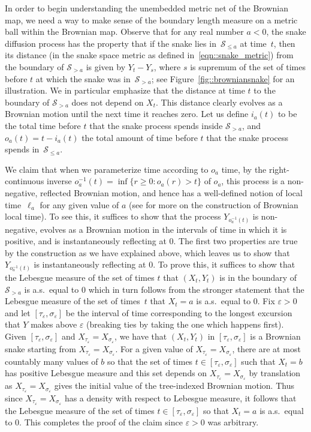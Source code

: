 \documentclass[JEP,XML,SOM,Unicode]{cedram}
\let\mathcal\mathscr
\let\epsilon\varepsilon
\theoremstyle{plain}
\numberwithin{theorem}{section}
\theoremstyle{definition}
\newcommand{\snake}{{\mathcal S}}
\begin{document}
In order to begin understanding the unembedded metric net of the Brownian map, we need a way to make sense of the boundary length measure on a metric ball within the Brownian map. Observe that for any real number $a < 0$, the snake diffusion process has the property that if the snake lies in~$\snake_{\leq a}$ at time~$t$, then its distance (in the snake space metric as defined in~\eqref{eqn::snake_metric}) from the boundary of $\snake_{>a}$ is given by $Y_t - Y_s$, where $s$ is supremum of the set of times before $t$ at which the snake was in~$\snake_{>a}$; see Figure~\ref{fig::browniansnake} for an illustration. We in particular emphasize that the distance at time $t$ to the boundary of $\snake_{>a}$ does not depend on $X_t$. This distance clearly evolves as a Brownian motion until the next time it reaches zero. Let us define $i_a(t)$ to be the total time before $t$ that the snake process spends inside $\snake_{>a}$, and $o_a(t) = t - i_a(t)$ the total amount of time before $t$ that the snake process spends in~$\snake_{\leq a}$.

We claim that when we parameterize time according to $o_a$ time, \ie by the right-continuous inverse $o_a^{-1}(t) = \inf\{r \geq 0 : o_a(r) > t\}$ of $o_a$, this process is a non-negative, reflected Brownian motion, and hence has a well-defined notion of local time~$\ell_a$ for any given value of $a$ (see \cite[Chap.\,VI]{ry99martingales} for more on the construction of Brownian local time). To see this, it suffices to show that the process $Y_{o_a^{-1}(t)}$ is non-negative, evolves as a Brownian motion in the intervals of time in which it is positive, and is instantaneously reflecting at $0$. The first two properties are true by the construction as we have explained above, which leaves us to show that $Y_{o_a^{-1}(t)}$ is instantaneously reflecting at $0$. To prove this, it suffices to show that the Lebesgue measure of the set of times $t$ that $(X_t,Y_t)$ is in the boundary of $\snake_{> a}$ is a.s.\ equal to $0$ which in turn follows from the stronger statement that the Lebesgue measure of the set of times~$t$ that $X_t = a$ is a.s.\ equal to $0$. Fix $\epsilon > 0$ and let $[\tau_\epsilon,\sigma_\epsilon]$ be the interval of time corresponding to the longest excursion that $Y$ makes above $\epsilon$ (breaking ties by taking the one which happens first). Given $[\tau_\epsilon,\sigma_\epsilon]$ and $X_{\tau_\epsilon} = X_{\sigma_\epsilon}$, we have that $(X_t,Y_t)$ in $[\tau_\epsilon,\sigma_\epsilon]$ is a Brownian snake starting from $X_{\tau_\epsilon} = X_{\sigma_\epsilon}$. For a given value of $X_{\tau_\epsilon} = X_{\sigma_\epsilon}$, there are at most countably many values of $b$ so that the set of times $t \in [\tau_\epsilon,\sigma_\epsilon]$ such that $X_t = b$ has positive Lebesgue measure and this set depends on $X_{\tau_\epsilon} = X_{\sigma_\epsilon}$ by translation as $X_{\tau_\epsilon} = X_{\sigma_\epsilon}$ gives the initial value of the tree-indexed Brownian motion. Thus since $X_{\tau_\epsilon} = X_{\sigma_\epsilon}$ has a density with respect to Lebesgue measure, it follows that the Lebesgue measure of the set of times $t \in [\tau_\epsilon,\sigma_\epsilon]$ so that $X_t = a$ is a.s.\ equal to $0$. This completes the proof of the claim since $\epsilon > 0$ was arbitrary.
\end{document}
